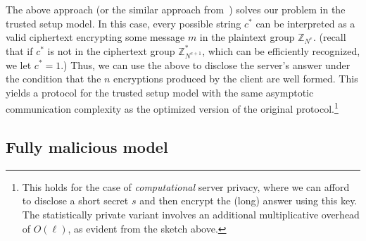 \documentclass[11pt]{article}
\newcommand{\Z}{{\mathbb{Z}}}
\begin{document}
The above approach (or the similar approach from~\cite{L05}) solves
our problem in the trusted setup model. In this case, every
possible string $c^*$ can be interpreted as a valid ciphertext
encrypting some message $m$ in the plaintext group $\Z_{N^e}$.
(recall that if $c^*$ is not in the ciphertext group $\Z^*_{N^{e+1}}$, which
can be efficiently recognized, we let $c^*=1$.) Thus, we can use
the above to disclose the server's answer under the condition that
the $n$ encryptions produced by the client are well formed. This
yields a protocol for the trusted setup model
with the same asymptotic communication complexity as the optimized
version of the original protocol.\footnote{This holds for the case
of {\em computational} server privacy, where we can afford to
disclose a short secret $s$ and then encrypt the (long) answer
using this key. The statistically private variant involves an
additional multiplicative overhead of $O(\ell)$, as evident from the sketch above. }

\subsection{Fully malicious model}
\label{sec-fullmalicious}
\end{document}
